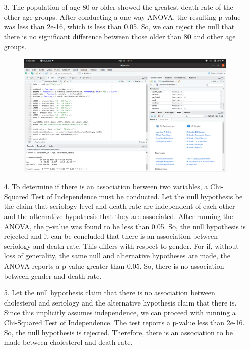 \documentclass[12pt]{article}
\begin{document}
\begin{enumerate}
\begin{figure}[!h]
	\end{figure}
	\item[3.] The population of age 80 or older showed the greatest death rate of the other age groups. 
		After conducting a one-way ANOVA, the resulting p-value was less than 2e-16, which is less than 0.05.
		So, we can reject the null that there is no significant difference between those older than 80 and other age groups.
	\begin{figure}[!h]
		\centering
		\includegraphics[width=\linewidth]{p3.png}
	\end{figure}
	\item[4.] To determine if there is an association between two variables, a Chi-Squared Test of Independence must 
		be conducted. Let the null hypothesis be the claim that seriology level and death rate are independent of 
		each other and the alternative hypothesis that they are associated. After running the ANOVA, the p-value was found to be less than 0.05. So, the null hypothesis is rejected and it can be 
		concluded that there is an association between seriology and death rate. This differs with respect to gender. 
		For if, without loss of generality, the same null and alternative hypotheses are made, the ANOVA
		 reports a p-value greater than 0.05. So, there is no association between gender and death rate.
	\item[5.] Let the null hypothesis claim that there is no association between cholesterol and seriology and the 
		alternative hypothesis claim that there is. Since this implicitly assumes independence, we can proceed 
		with running a Chi-Squared Test of Independence. The test reports a p-value less than 2e-16. So, the null 
		hypothesis is rejected. Therefore, there is an association to be made between cholesterol and death rate.
	\begin{figure}[!h]

\end{figure}
\end{enumerate}
\end{document}
